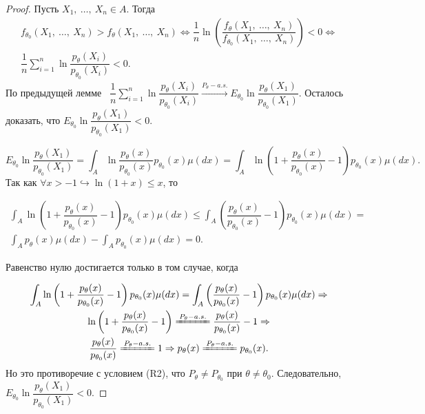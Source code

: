 \begin{proof}
    Пусть $\displaystyle X_{1} ,\ \dotsc ,\ X_{n} \in A$. Тогда
    \begin{gather*}
        f_{\theta _{0}}( X_{1} ,\ \dotsc ,\ X_{n})  >f_{\theta }( X_{1} ,\ \dotsc ,\ X_{n}) \Leftrightarrow \dfrac{1}{n}\ln\left(\dfrac{f_{\theta }( X_{1} ,\ \dotsc ,\ X_{n})}{f_{\theta _{0}}( X_{1} ,\ \dotsc ,\ X_{n})}\right) < 0\Leftrightarrow \\
        \dfrac{1}{n}\sum _{i=1}^{n}\ln\dfrac{p_{\theta }( X_{i})}{p_{\theta _{0}}( X_{i})} < 0.
    \end{gather*}
    По предыдущей лемме \ $\displaystyle \dfrac{1}{n}\sum _{i=1}^{n}\ln\dfrac{p_{\theta }( X_{i})}{p_{\theta _{0}}( X_{i})}\xrightarrow{P_{\theta } -a.s.} E_{\theta _{0}}\ln\dfrac{p_{\theta }( X_{1})}{p_{\theta _{0}}( X_{1})}$. Осталось доказать, что $\displaystyle E_{\theta _{0}}\ln\dfrac{p_{\theta }( X_{1})}{p_{\theta _{0}}( X_{1})} < 0$.
    
    
    \begin{equation*}
        E_{\theta _{0}}\ln\dfrac{p_{\theta }( X_{1})}{p_{\theta _{0}}( X_{1})} =\int _{A}\ln\dfrac{p_{\theta }( x)}{p_{\theta _{0}}( x)} p_{\theta _{0}}( x) \mu ( dx) =\int _{A}\ln\left( 1+\dfrac{p_{\theta }( x)}{p_{\theta _{0}}( x)} -1\right) p_{\theta _{0}}( x) \mu ( dx) .
    \end{equation*}
    Так как $\displaystyle \forall x >-1\hookrightarrow \ln( 1+x) \leqslant x$, то
    
    
    \begin{gather*}
        \int _{A}\ln\left( 1+\dfrac{p_{\theta }( x)}{p_{\theta _{0}}( x)} -1\right) p_{\theta _{0}}( x) \mu ( dx) \leqslant \int _{A}\left(\dfrac{p_{\theta }( x)}{p_{\theta _{0}}( x)} -1\right) p_{\theta _{0}}( x) \mu ( dx) =\\
        \int _{A} p_{\theta }( x) \mu ( dx) -\int _{A} p_{\theta _{0}}( x) \mu ( dx) =0.
    \end{gather*}
    
    
    Равенство нулю достигается только в том случае, когда 
    
    
    \begin{gather*}
        \int _{A}\ln\left( 1+\dfrac{p_{\theta }( x)}{p_{\theta _{0}}( x)} -1\right) p_{\theta _{0}}( x) \mu ( dx) =\int _{A}\left(\dfrac{p_{\theta }( x)}{p_{\theta _{0}}( x)} -1\right) p_{\theta _{0}}( x) \mu ( dx) \Rightarrow \\
        \ln\left( 1+\dfrac{p_{\theta }( x)}{p_{\theta _{0}}( x)} -1\right)\xlongequal{P_{\theta } -a.s.}\dfrac{p_{\theta }( x)}{p_{\theta _{0}}( x)} -1\Rightarrow \\
        \dfrac{p_{\theta }( x)}{p_{\theta _{0}}( x)}\xlongequal{P_{\theta } -a.s.} 1\Rightarrow p_{\theta }( x)\xlongequal{P_{\theta } -a.s.} p_{\theta _{0}}( x) .
    \end{gather*}
    Но это противоречие с условием (R2), что $\displaystyle P_{\theta } \neq P_{\theta _{0}}$ при $\displaystyle \theta \neq \theta _{0}$. Следовательно, $\displaystyle E_{\theta _{0}}\ln\dfrac{p_{\theta }( X_{1})}{p_{\theta _{0}}( X_{1})} < 0$.
\end{proof}
